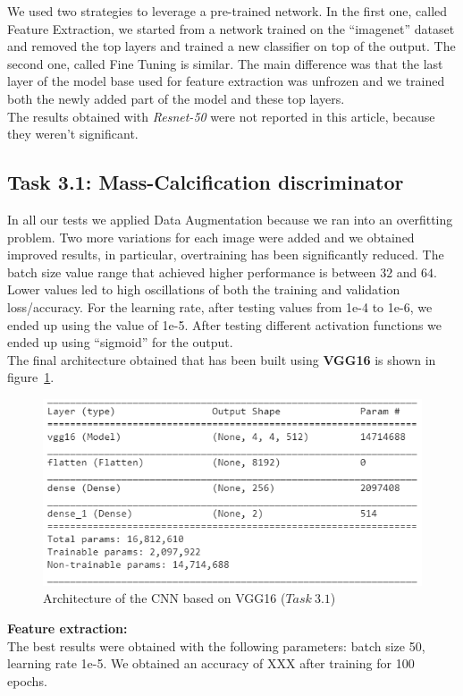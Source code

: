 \documentclass[11pt,a4paper,oneside]{article}
\begin{document}
We used two strategies to leverage a pre-trained network. In the first one, called Feature Extraction, we started from a network trained on the “imagenet” dataset and removed the top layers and trained a new classifier on top of the output.
The second one, called Fine Tuning is similar. The main difference was that the last layer of the model base used for feature extraction was unfrozen and we trained both the newly added part of the model and these top layers. \\
The results obtained with \textit{Resnet-50} were not reported in this article, because they weren't significant.

\subsection{Task 3.1: Mass-Calcification discriminator}
In all our tests we applied Data Augmentation because we ran into an overfitting problem. Two more variations for each image were added and we obtained improved results, in particular, overtraining has been significantly reduced. The batch size value range that achieved higher performance is between $32$ and $64$. Lower values led to high oscillations of both the training and validation loss/accuracy. For the learning rate, after testing values from 1e-4 to 1e-6, we ended up using the value of 1e-5. After testing different activation functions we ended up using “sigmoid” for the output. \\

The final architecture obtained that has been built using \textbf{VGG16} is shown in figure~\ref{fig:vgg16_model}. 

\begin{figure}[h]
\centering
\includegraphics[width=.5\textwidth]{images/Task 3/VGG16 3.1/Model}
\caption{Architecture of the CNN based on VGG16 ($Task\ 3.1$)}
\label{fig:vgg16_model}
\end{figure}

\textbf{Feature extraction:}\\
The best results were obtained with the following parameters: batch size 50, learning rate 1e-5. We obtained an accuracy of XXX after training for 100 epochs.
\end{document}

